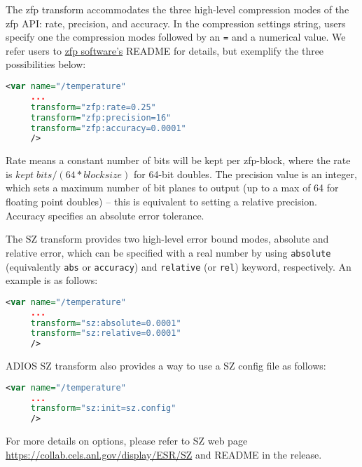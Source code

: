 The zfp transform accommodates the three high-level compression modes of the zfp API: rate, precision, and accuracy.
In the compression settings string, users specify one the compression modes followed by an \texttt{=} and a numerical value.
We refer users to \href{http://computation.llnl.gov/projects/floating-point-compression}{zfp software's} README for details,
but exemplify the three possibilities below:
\begin{lstlisting}[language=XML]
<var name="/temperature"
     ...
     transform="zfp:rate=0.25"
     transform="zfp:precision=16"
     transform="zfp:accuracy=0.0001"
     />
\end{lstlisting}
Rate means a constant number of bits will be kept per zfp-block, where the rate is $ kept \; bits/ (64*blocksize)$ for 64-bit doubles.
The precision value is an integer, which sets a maximum number of bit planes to output (up to a max of 64 for floating point doubles) -- 
this is equivalent to setting a relative precision.
Accuracy specifies an absolute error tolerance.

The SZ transform provides two high-level error bound modes, absolute and relative error, which can be specified with a real number by using \texttt{absolute} (equivalently \texttt{abs} or \texttt{accuracy}) and \texttt{relative} (or \texttt{rel}) keyword, respectively. An example is as follows:
\begin{lstlisting}[language=XML]
<var name="/temperature"
     ...
     transform="sz:absolute=0.0001"
     transform="sz:relative=0.0001"
     />
\end{lstlisting}

ADIOS SZ transform also provides a way to use a SZ config file as follows:
\begin{lstlisting}[language=XML]
<var name="/temperature"
     ...
     transform="sz:init=sz.config"
     />
\end{lstlisting}

For more details on options, please refer to SZ web page \url{https://collab.cels.anl.gov/display/ESR/SZ} and README in the release.

